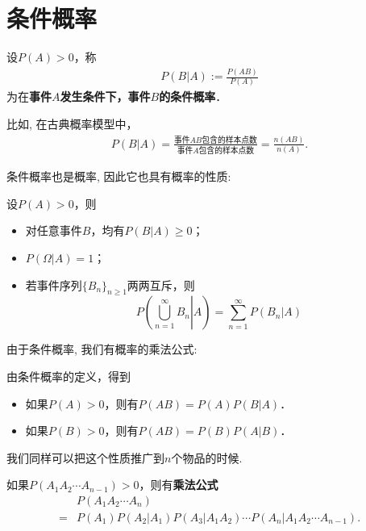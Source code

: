 \section{条件概率}

\begin{definition}
    设$P(A)>0$，称
    \begin{align*}
        P(B|A):=\frac{P(AB)}{P(A)}
    \end{align*}
    为在\textbf{事件$A$发生条件下，事件$B$的条件概率}．
\end{definition}

比如, 在古典概率模型中，
\begin{align*}
    P(B|A)=\frac{\mbox{事件$AB$包含的样本点数}}{\mbox{事件$A$包含的样本点数}}=\frac{n(AB)}{n(A)}.
\end{align*}

条件概率也是概率, 因此它也具有概率的性质: 

\begin{proposition}
    设$P(A)>0$，则
    \begin{itemize}
        \item 对任意事件$B$，均有$P(B|A)\ge 0$；
        \item $P(\Omega|A)=1$；
        \item 若事件序列$\{B_n\}_{n\ge 1}$两两互斥，则
              $$P\left( \left. \bigcup_{n=1}^{\infty} B_n \right| A\right)=\sum_{n=1}^{\infty} P(B_n|A)$$
    \end{itemize}
\end{proposition}

由于条件概率, 我们有概率的乘法公式: 

\begin{theorem}[乘法公式]
    由条件概率的定义，得到
    \begin{itemize}
        \item 如果$P(A)>0$，则有$P(AB)=P(A)P(B|A)$．
        \item 如果$P(B)>0$，则有$P(AB)=P(B)P(A|B)$．
    \end{itemize}
\end{theorem}

我们同样可以把这个性质推广到$n$个物品的时候. 

\begin{corollary}
    如果$P(A_1 A_2\cdots A_{n-1})>0$，则有\textbf{乘法公式}
    \begin{align*}
          & P(A_1A_2\cdots A_n)                                                \\
        = & P(A_1)P(A_2|A_1)P(A_3|A_1 A_2)\cdots P(A_n|A_1 A_2\cdots A_{n-1}).
    \end{align*}
\end{corollary}

